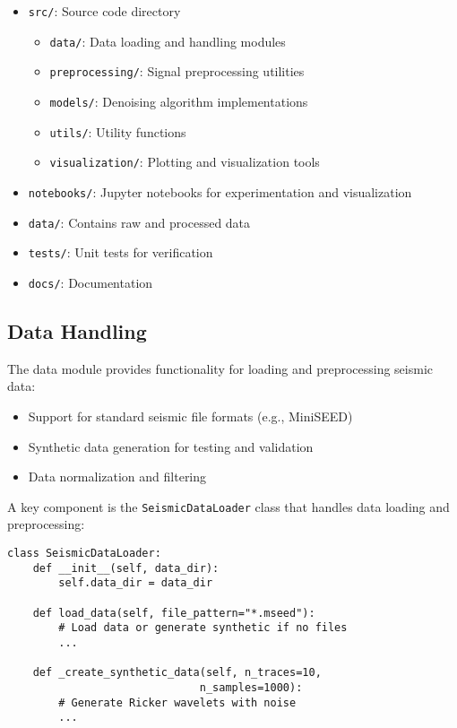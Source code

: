 \documentclass[10pt,twocolumn]{article}
\begin{document}
\begin{itemize}
\item \texttt{src/}: Source code directory
  \begin{itemize}
  \item \texttt{data/}: Data loading and handling modules
  \item \texttt{preprocessing/}: Signal preprocessing utilities
  \item \texttt{models/}: Denoising algorithm implementations
  \item \texttt{utils/}: Utility functions
  \item \texttt{visualization/}: Plotting and visualization tools
  \end{itemize}
\item \texttt{notebooks/}: Jupyter notebooks for experimentation and visualization
\item \texttt{data/}: Contains raw and processed data
\item \texttt{tests/}: Unit tests for verification
\item \texttt{docs/}: Documentation
\end{itemize}

\subsection{Data Handling}
The data module provides functionality for loading and preprocessing seismic data:

\begin{itemize}
\item Support for standard seismic file formats (e.g., MiniSEED)
\item Synthetic data generation for testing and validation
\item Data normalization and filtering
\end{itemize}

A key component is the \texttt{SeismicDataLoader} class that handles data loading and preprocessing:

\begin{lstlisting}
class SeismicDataLoader:
    def __init__(self, data_dir):
        self.data_dir = data_dir
        
    def load_data(self, file_pattern="*.mseed"):
        # Load data or generate synthetic if no files
        ...
        
    def _create_synthetic_data(self, n_traces=10, 
                              n_samples=1000):
        # Generate Ricker wavelets with noise
        ...
\end{lstlisting}
\end{document}
